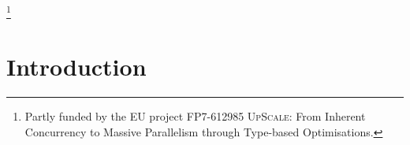 \documentclass[sigplan]{acmart}
\begin{document}
\newcommand{\Upscale}{\textsc{UpScale}\xspace}
\newcommand{\parT}{ParT\xspace}
\newcommand{\parTs}{ParTs\xspace}

\newcommand{\TT}[1]{\atask{g}{E[#1]}}
\newcommand{\typePar}[1]{\ensuremath{\mathit{Par}[#1]}}
\newcommand{\typeFut}[1]{\ensuremath{\mathit{Fut}[#1]}}
\newcommand{\typeMaybe}[1]{\ensuremath{\mathit{Maybe}[#1]}}
\newcommand{\singlePar}[1]{\ensuremath{\{#1\}}}
\newcommand{\prunesymbol}[0]{\ensuremath{\ll }}
\newcommand{\prunen}[3]{\ensuremath{#2 \prunesymbol_{#1} #3}}
\newcommand{\single}[1]{\ensuremath{\{ #1 \}}}
\newcommand{\parrn}[3]{\ensuremath{#2 \,||_{#1}\, #3}}
\newcommand{\parrnl}[4]{\ensuremath{#3 \,||^{#1}_{#2}\, #4}}
\newcommand{\bind}[2]{\ensuremath{#1 \gg\!\!= #2}}
\newcommand{\lin}[1]{\ensuremath{\texttt{lin}\ #1}}
\newcommand{\un}[1]{\ensuremath{\texttt{read}\ #1}}
\newcommand{\sub}[0]{\ensuremath{<:}}
%
\newcommand{\mode}[0]{\modekw{} \ }
\newcommand{\moden}[1]{\ensuremath{\modekw{}_{#1} \ }}
\newcommand{\modekw}[0]{\ensuremath{\kappa}}
\newcommand{\modekwn}[1]{\ensuremath{\kappa}_{#1} }
\newcommand{\e}[0]{\hookrightarrow}

\newcommand{\peekkw}{\texttt{peek}}
\newcommand{\apoison}[1]{\ensuremath{(\texttt{kill} \; #1)}}
\newcommand{\atask}[2]{\ensuremath{(\texttt{task}_{#1}\ #2)}}
\newcommand{\sfut}[1]{\ensuremath{(\texttt{fut}_{#1})}}  %
\newcommand{\afut}[2]{\ensuremath{(\texttt{fut}_{#1}\ #2)}}  %
\newcommand{\peekn}[3]{\ensuremath{\peekkw^{#2}_{#1}\ #3}}
\newcommand{\poisoningStates}[0]{\ensuremath{\pi}}
\newcommand{\peeksn}[2]{\ensuremath{\peekkw^{\poisoningStates}_{#1}\ #2}}

\thanks{Partly funded by the EU project FP7-612985 \Upscale: From Inherent Concurrency
    to Massive Parallelism through Type-based Optimisations.}


\maketitle

\section{Introduction}
\label{sec:introduction}
\end{document}
